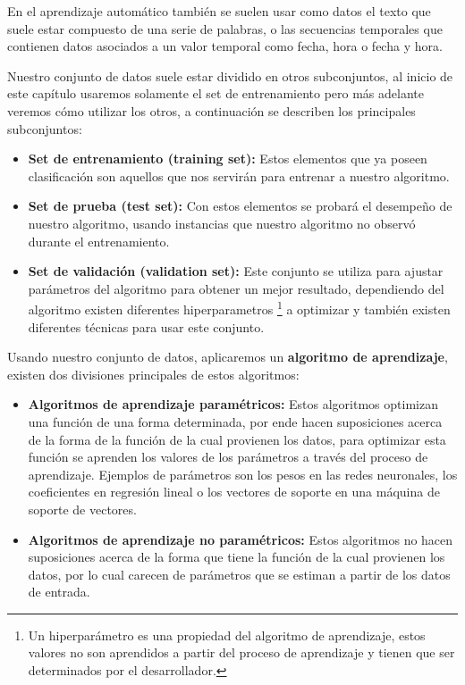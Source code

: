 \documentclass[11pt,fleqn]{book} %
\begin{document}
En el aprendizaje automático también se suelen usar como datos el texto que suele estar compuesto de una serie de palabras, o las secuencias temporales que contienen datos asociados a un valor temporal como fecha, hora o fecha y hora.

Nuestro conjunto de datos suele estar dividido en otros subconjuntos, al inicio de este capítulo usaremos solamente el set de entrenamiento pero más adelante veremos cómo utilizar los otros, a continuación se describen los principales subconjuntos:


\begin{itemize}
\item \textbf{Set de entrenamiento (training set):} Estos elementos que ya poseen clasificación son aquellos que nos servirán para entrenar a nuestro algoritmo.
\item \textbf{Set de prueba (test set):} Con estos elementos se probará el desempeño de nuestro algoritmo, usando instancias que nuestro algoritmo no observó durante el entrenamiento.
\item \textbf{Set de validación (validation set):} Este conjunto se utiliza para ajustar parámetros del algoritmo para obtener un mejor resultado, dependiendo del algoritmo existen diferentes hiperparametros \footnote{ Un hiperparámetro es una propiedad del algoritmo de aprendizaje, estos valores no son aprendidos a partir del proceso de aprendizaje y tienen que ser determinados por el desarrollador.} a optimizar y también existen diferentes técnicas para usar este conjunto.
\end{itemize}

Usando nuestro conjunto de datos, aplicaremos un \textbf{algoritmo de aprendizaje}, existen dos divisiones principales de estos algoritmos:

\begin{itemize}
\item \textbf{Algoritmos de aprendizaje paramétricos:} Estos algoritmos optimizan una función de una forma determinada, por ende hacen suposiciones acerca de la forma de la función de la cual provienen los datos, para optimizar esta función se aprenden los valores de los parámetros a través del proceso de aprendizaje. Ejemplos de parámetros son los pesos en las redes neuronales, los coeficientes en regresión lineal o los vectores de soporte en una máquina de soporte de vectores.
\item \textbf{Algoritmos de aprendizaje no paramétricos:} Estos algoritmos no hacen suposiciones acerca de la forma que tiene la función de la cual provienen los datos, por lo cual carecen de parámetros que se estiman a partir de los datos de entrada. 
\end{itemize}
\end{document}
